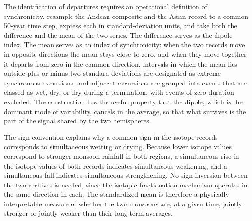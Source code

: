 \documentclass[11pt]{article}
\theoremstyle{definition}
\begin{document}
The identification of departures requires an operational definition of synchronicity. \citeauthor{olson2026} resample the Andean composite and the Asian record to a common 50-year time step, express each in standard-deviation units, and take both the difference and the mean of the two series. The difference serves as the dipole index. The mean serves as an index of synchronicity: when the two records move in opposite directions the mean stays close to zero, and when they move together it departs from zero in the common direction. Intervals in which the mean lies outside plus or minus two standard deviations are designated as extreme synchronous excursions, and adjacent excursions are grouped into events that are classed as wet, dry, or dry during a termination, with events of zero duration excluded. The construction has the useful property that the dipole, which is the dominant mode of variability, cancels in the average, so that what survives is the part of the signal shared by the two hemispheres.

The sign convention explains why a common sign in the isotope records corresponds to simultaneous wetting or drying. Because lower isotope values correspond to stronger monsoon rainfall in both regions, a simultaneous rise in the isotope values of both records indicates simultaneous weakening, and a simultaneous fall indicates simultaneous strengthening. No sign inversion between the two archives is needed, since the isotopic fractionation mechanism operates in the same direction in each. The standardized mean is therefore a physically interpretable measure of whether the two monsoons are, at a given time, jointly stronger or jointly weaker than their long-term averages.
\end{document}
